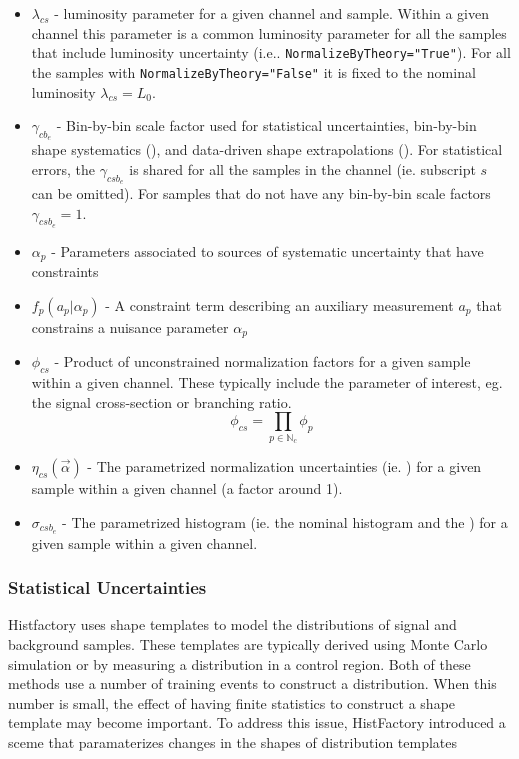 \begin{itemize}
\item $ \lambda_{cs}$ - luminosity parameter for a given channel and sample.  Within a given channel this parameter is a common luminosity parameter for all the samples that include luminosity uncertainty (i.e.. \texttt{NormalizeByTheory="True"}).  For all the samples with  \texttt{NormalizeByTheory="False"} it is fixed to the nominal luminosity $\lambda_{cs}=L_0$.
\item $\gamma_{cb_e}$ - Bin-by-bin scale factor used for statistical uncertainties, bin-by-bin shape systematics (\SS), and data-driven shape extrapolations (\SF).  For statistical errors, the $\gamma_{csb_e}$ is shared for all the samples in the channel (ie. subscript $s$ can be omitted).  For samples that do not have any bin-by-bin scale factors $\gamma_{csb_e}=1$.
\item $\alpha_p$ - Parameters associated to sources of systematic uncertainty that have constraints
\item $f_p(a_p|\alpha_p)$ - A constraint term describing an auxiliary measurement $a_p$ that constrains a nuisance parameter $\alpha_p$
\item $ \phi_{cs}$ - Product of unconstrained normalization factors for a given sample within a given channel.  These typically include the parameter of interest, eg. the signal cross-section or branching ratio.
 \begin{equation}
 \phi_{cs}= \prod_{p\in\mathbb{N}_c} \phi_p
 \end{equation}
\item $\eta_{cs}(\vec\alpha)$  - The parametrized normalization uncertainties (ie. \OS) for a given sample within a given channel (a factor around 1).
\item $\sigma_{csb_e}$  - The parametrized histogram (ie. the nominal histogram and the \HS) for a given sample within a given channel.
\end{itemize}


\subsubsection{Statistical Uncertainties}
Histfactory uses shape templates to model the distributions of signal and background samples.
These templates are typically derived using Monte Carlo simulation or by measuring a distribution
in a control region.
Both of these methods use a number of training events to construct a distribution.
When this number is small, the effect of having finite statistics to construct a
shape template may become important.
To address this issue, HistFactory introduced a sceme that paramaterizes changes in the shapes
of distribution templates 









